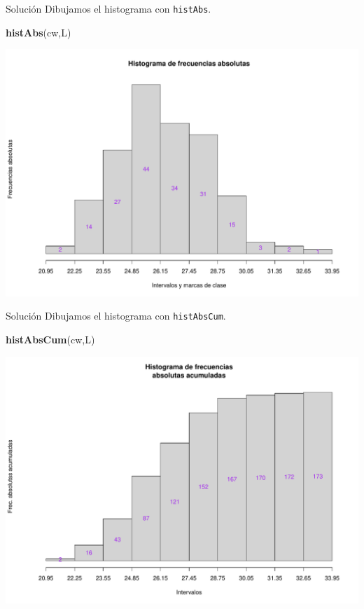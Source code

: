 \documentclass[
  ignorenonframetext,
]{beamer}
\newenvironment{Shaded}{\begin{snugshade}}{\end{snugshade}}
\newcommand{\FunctionTok}[1]{\textcolor[rgb]{0.13,0.29,0.53}{\textbf{#1}}}
\newcommand{\NormalTok}[1]{#1}
\begin{document}
\begin{frame}[fragile]{Solución}
\label{soluciuxf3n-39}
Dibujamos el histograma con \texttt{histAbs}.

\begin{Shaded}
\begin{Highlighting}[]
\FunctionTok{histAbs}\NormalTok{(cw,L)}
\end{Highlighting}
\end{Shaded}

\includegraphics{R_base_files/figure-beamer/unnamed-chunk-246-1.pdf}
\end{frame}

\begin{frame}[fragile]{Solución}
\label{soluciuxf3n-40}
Dibujamos el histograma con \texttt{histAbsCum}.

\begin{Shaded}
\begin{Highlighting}[]
\FunctionTok{histAbsCum}\NormalTok{(cw,L)}
\end{Highlighting}
\end{Shaded}

\includegraphics{R_base_files/figure-beamer/unnamed-chunk-247-1.pdf}
\end{frame}
\end{document}
